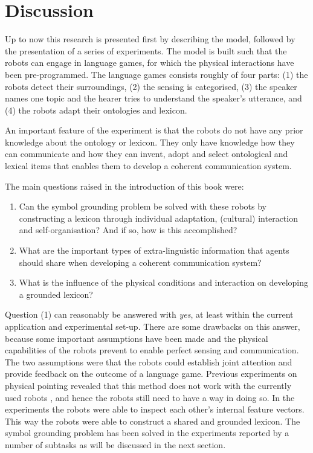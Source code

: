 \chapter{Discussion}\label{ch:disc}

Up to now this research is presented first by describing the model, followed by the presentation of a series of experiments. The model is built such that the robots can engage in language games, for which the physical interactions have been pre-programmed. The language games consists roughly of four parts: (1) the robots detect their surroundings, (2) the sensing is categorised, (3) the speaker names one topic and the hearer tries to understand the speaker's utterance, and (4) the robots adapt their ontologies and lexicon.

An important feature of the experiment is that the robots do not have any prior knowledge about the ontology or lexicon. They only have knowledge how they can communicate and how they can invent, adopt and select ontological and lexical items that enables them to develop a coherent communication system. 

The main questions raised in the introduction of this book were:

\begin{enumerate}
\item Can the symbol grounding problem be solved with these robots by constructing a lexicon through individual adaptation, (cultural) interaction and self-organisation? And if so, how is this accomplished?
\item What are the important types of extra-linguistic information that agents should share when developing a coherent communication system?
\item What is the influence of the physical conditions and interaction on developing a grounded lexicon?
\end{enumerate}

Question (1) can reasonably be answered with {\em yes}, at least within the current application and experimental set-up. There are some drawbacks on this answer, because some important assumptions have been made and the physical capabilities of the robots prevent to enable perfect sensing and communication. The two assumptions were that the robots could establish joint attention and provide feedback on the outcome of a language game. Previous experiments on physical pointing revealed that this method does not work with the currently used robots \citep{vogt:1998b}, and hence the robots still need to have a way in doing so. In the experiments the robots were able to inspect each other's internal feature vectors. This way the robots were able to construct a shared and grounded lexicon. The symbol grounding problem has been solved in the experiments reported by a number of subtasks as will be discussed in the next section.

